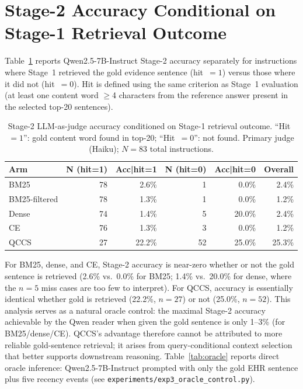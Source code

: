 \documentclass{article}
\begin{document}

\section{Stage-2 Accuracy Conditional on Stage-1 Retrieval Outcome}
\label{app:condacc}

Table~\ref{tab:condacc} reports Qwen2.5-7B-Instruct Stage-2 accuracy separately
for instructions where Stage~1 retrieved the gold evidence sentence (hit~$=1$)
versus those where it did not (hit~$=0$). Hit is defined using the same criterion
as Stage~1 evaluation (at least one content word $\geq$4 characters from the
reference answer present in the selected top-20 sentences).

\begin{table}[H]
\centering
\caption{Stage-2 LLM-as-judge accuracy conditioned on Stage-1 retrieval outcome.
  ``Hit~$=1$'': gold content word found in top-20; ``Hit~$=0$'': not found.
  Primary judge (Haiku); $N{=}83$ total instructions.}
\label{tab:condacc}
\small
\begin{tabular}{@{}lrrrrr@{}}
\toprule
Arm & N (hit=1) & Acc|hit=1 & N (hit=0) & Acc|hit=0 & Overall \\
\midrule
BM25           & 78 & 2.6\% & 1  & 0.0\% & 2.4\% \\
BM25-filtered  & 78 & 1.3\% & 1  & 0.0\% & 1.2\% \\
Dense          & 74 & 1.4\% & 5  & 20.0\% & 2.4\% \\
CE             & 76 & 1.3\% & 3  & 0.0\% & 1.2\% \\
QCCS           & 27 & 22.2\% & 52 & 25.0\% & 25.3\% \\
\bottomrule
\end{tabular}
\end{table}

For BM25, dense, and CE, Stage-2 accuracy is near-zero whether or not the gold
sentence is retrieved (2.6\% vs.\ 0.0\% for BM25; 1.4\% vs.\ 20.0\% for dense,
where the $n{=}5$ miss cases are too few to interpret). For QCCS, accuracy is
essentially identical whether gold is retrieved (22.2\%, $n{=}27$) or not
(25.0\%, $n{=}52$). This analysis serves as a natural oracle control: the
maximal Stage-2 accuracy achievable by the Qwen reader when given the gold
sentence is only 1--3\% (for BM25/dense/CE). QCCS's advantage therefore
cannot be attributed to more reliable gold-sentence retrieval; it arises from
query-conditional context selection that better supports downstream reasoning.
Table~\ref{tab:oracle} reports direct oracle inference: Qwen2.5-7B-Instruct
prompted with only the gold EHR sentence plus five recency events (see
\texttt{experiments/exp3\_oracle\_control.py}).
\end{document}
